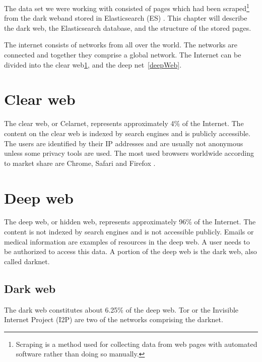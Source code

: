 The data set we were working with consisted of pages which had been scraped\footnote{Scraping is a method used for collecting data from web pages with automated software rather than doing so manually.} from the dark weband stored in Elasticsearch (ES) \cite{elasticSearch}. This chapter will describe the dark web, the Elasticsearch database, and the structure of the stored pages.

The internet consists of networks from all over the world. The networks are connected and together they comprise a global network. The Internet can be divided into the clear web\ref{clearWeb}, and the deep net~\ref{deepWeb}.

\section{Clear web} \label{clearWeb}
The clear web, or Celarnet, represents approximately 4\% of the Internet. The content on the clear web is indexed by search engines and is publicly accessible. The users are identified by their IP addresses and are usually not anonymous unless some privacy tools are used. The most used browsers worldwide according to market share are Chrome, Safari and Firefox \cite{browserMarketShare}.

\section{Deep web} \label{deebWeb}
The deep web, or hidden web, represents approximately 96\% of the Internet. The content is not indexed by search engines and is not accessible publicly. Emails or medical information are examples of resources in the deep web. A user needs to be authorized to access this data. A portion of the deep web is the dark web, also called darknet. 

\subsection{Dark web} \label{darkWeb}
The dark web constitutes about 6.25\% of the deep web. Tor \cite{torIntro} or the Invisible Internet Project (I2P) \cite{i2pIntro} are two of the networks comprising the darknet. 

